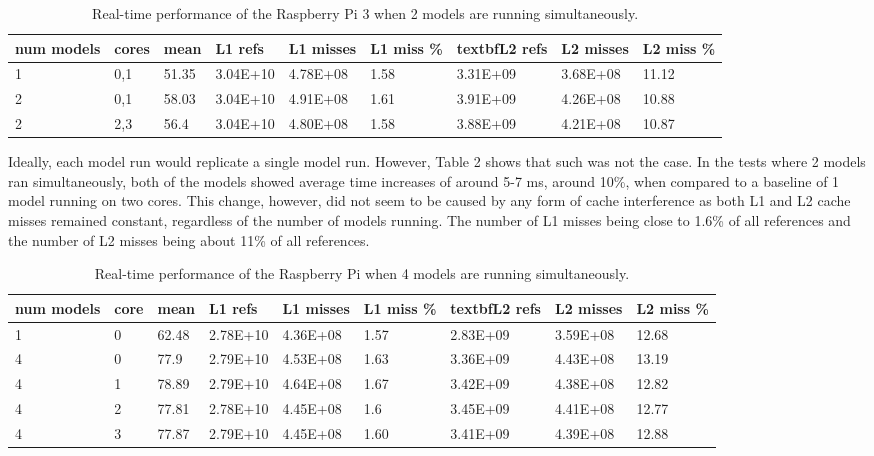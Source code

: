 \documentclass[10pt, conference]{IEEEtran}
\begin{document}
\begin{table}
  \begin{tabular} {| l | l | l | l | l | l | l | l | l |}
  \hline
  \textbf{num models} & \textbf{cores} & \textbf{mean} & \textbf{L1 refs} & \textbf{L1 
    misses} & \textbf{L1 miss \%} & textbf{L2 refs} & \textbf{L2 misses} & \textbf{L2 miss \%} \\ \hline
  1 & 0,1 & 51.35 & 3.04E+10 & 4.78E+08 & 1.58 & 3.31E+09 & 3.68E+08 & 11.12\\ \hline
  2 & 0,1 & 58.03 & 3.04E+10 & 4.91E+08 & 1.61 & 3.91E+09 & 4.26E+08 & 10.88 \\ \hline
  2 & 2,3 & 56.4 & 3.04E+10 & 4.80E+08 & 1.58 & 3.88E+09 & 4.21E+08 & 10.87 \\ \hline
  \end{tabular}
  \caption{Real-time performance of the Raspberry Pi 3 when 2 models are running simultaneously.}
\end{table}

Ideally, each model run would replicate a single model run. However, Table 2 shows that such was not 
the case. In the tests where 2 models ran simultaneously, both of the models showed average time 
increases of around 5-7 ms, around 10\%, when compared to a baseline of 1 model running on two cores. 
This change, however, did not seem to be caused by any form of cache interference as both L1 and L2 
cache misses remained constant, regardless of the number of models running. The number of L1 misses 
being close to 1.6\% of all references and the number of L2 misses being about 11\% of all 
references.

\begin{table}
  \begin{tabular} {| l | l | l | l | l | l | l | l | l |}
  \hline
  \textbf{num models} & \textbf{core} & \textbf{mean} & \textbf{L1 refs} & \textbf{L1 
    misses} & \textbf{L1 miss \%} & textbf{L2 refs} & \textbf{L2 misses} & \textbf{L2 miss \%} \\ \hline
    1 & 0 &  62.48 & 2.78E+10 & 4.36E+08 & 1.57 & 2.83E+09 & 3.59E+08 & 12.68  \\ \hline
    4 & 0 & 77.9 & 2.79E+10 & 4.53E+08 & 1.63 & 3.36E+09 & 4.43E+08 & 13.19 \\ \hline
    4 & 1 & 78.89 & 2.79E+10 & 4.64E+08 & 1.67 & 3.42E+09 & 4.38E+08 & 12.82 \\ \hline
    4 & 2 & 77.81 & 2.78E+10 & 4.45E+08 & 1.6 & 3.45E+09 & 4.41E+08 & 12.77 \\ \hline
    4 & 3 & 77.87 & 2.79E+10 & 4.45E+08 & 1.60 & 3.41E+09 & 4.39E+08 & 12.88 \\ \hline
  \end{tabular}
  \caption{Real-time performance of the Raspberry Pi when 4 models are running simultaneously.}
\end{table}
\end{document}
